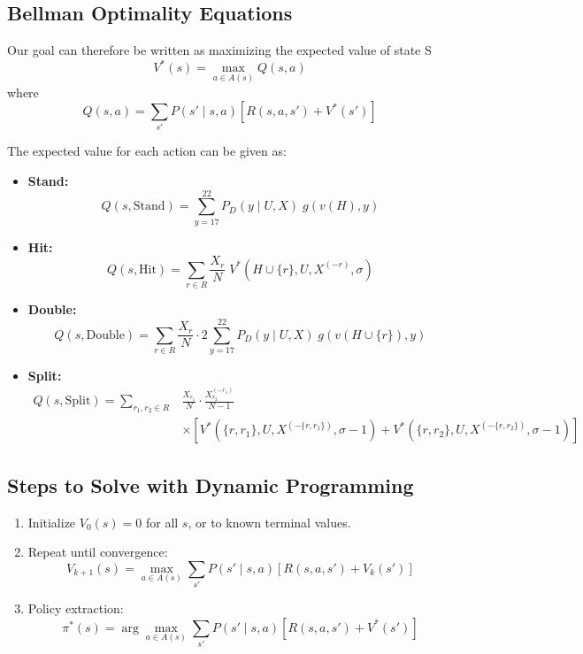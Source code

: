 \documentclass[12pt,a4paper]{cibb}
\begin{document}
\subsection{Bellman Optimality Equations}

Our goal can therefore be written as maximizing the expected value of state S
\[
  V^*(s) = \max_{a \in A(s)} Q(s, a)
\]
where
\[
  Q(s,a) = \sum_{s'} P(s' \mid s, a) \left[ R(s,a,s') + V^*(s') \right]
\]

The expected value for each action can be given as:

\begin{itemize}
  \item \textbf{Stand:}
  \[
    Q(s, \mathrm{Stand}) = \sum_{y=17}^{22} P_D(y \mid U, X)\; g(v(H), y)
  \]

  \item \textbf{Hit:}
  \[
    Q(s, \mathrm{Hit}) = \sum_{r \in R} \frac{X_r}{N}\; V^*(H \cup \{r\}, U, X^{(-r)}, σ)
  \]

  \item \textbf{Double:}
  \[
    Q(s, \mathrm{Double}) = \sum_{r \in R} \frac{X_r}{N} \cdot 2 \sum_{y=17}^{22} P_D(y \mid U, X)\; g(v(H \cup \{r\}), y)
  \]
  \item \textbf{Split:}
  \begin{align*}
    Q(s, \mathrm{Split}) =
    \sum_{r_1, r_2 \in R} & \frac{X_{r_1}}{N} \cdot \frac{X^{(-r_1)}_{r_2}}{N - 1} \\
    & \times \left[
      V^*(\{r, r_1\}, U, X^{(-\{r, r_1\})}, σ-1)
      + V^*(\{r, r_2\}, U, X^{(-\{r, r_2\})}, σ-1)
    \right]
  \end{align*}
\end{itemize}

\subsection{Steps to Solve with Dynamic Programming}

\begin{enumerate}
  \item Initialize \( V_0(s) = 0 \) for all \( s \), or to known terminal values.
  \item Repeat until convergence:
  \[
    V_{k+1}(s) = \max_{a \in A(s)} \sum_{s'} P(s' \mid s, a) [ R(s,a,s') + V_k(s') ]
  \]
  \item Policy extraction:
  \[
    \pi^*(s) = \arg\max_{a \in A(s)} \sum_{s'} P(s' \mid s,a) [ R(s,a,s') + V^*(s') ]
  \]
\end{enumerate}
\end{document}
